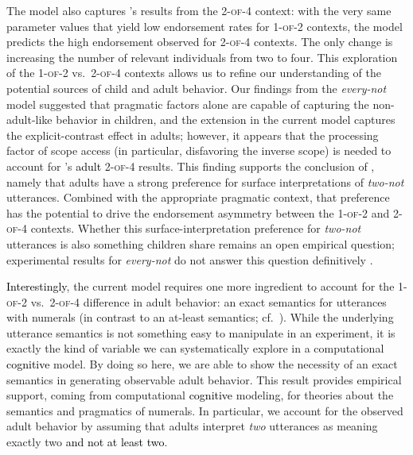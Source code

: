 \documentclass[cm]{glossa}
\newcommand{\lp}[1]{\textcolor{black}{#1}} %
\begin{document}
The model also captures \citeauthor{musolinolidz2003}'s results from the \textsc{2-of-4} context: with the very same parameter values that yield low endorsement rates for \textsc{1-of-2} contexts, the model predicts the high endorsement observed for \textsc{2-of-4} contexts. The only change is increasing the number of relevant individuals from two to four. This exploration of the \textsc{1-of-2} vs.~\textsc{2-of-4} contexts allows us to refine our understanding of the potential sources of child and adult behavior. Our findings from the \emph{every-not} model suggested that pragmatic factors alone are capable of capturing the non-adult-like behavior in children, and the extension in the current model captures the explicit-contrast effect in adults; however, it appears that the processing factor of scope access (in particular, disfavoring the inverse scope) is needed to account for \citeauthor{musolinolidz2003}'s \lp{adult} \textsc{2-of-4} results. This finding supports the conclusion of \citeauthor{musolinolidz2003}, namely that adults have a strong preference for surface interpretations of \emph{two-not} utterances. Combined with the appropriate pragmatic context, that preference has the potential to drive the endorsement asymmetry between the \textsc{1-of-2} and \textsc{2-of-4} contexts. Whether this surface-interpretation preference for  \textit{two-not} utterances is also something children share remains an open empirical question; experimental results for \emph{every-not} do not answer this question definitively \citep{viauetal2010}.

\lp{Interestingly}, the current model requires one more ingredient to account for the \textsc{1-of-2} vs.~\textsc{2-of-4} difference in adult behavior: an {exact} semantics for utterances with numerals (in contrast to an {at-least} semantics; cf.~\citealp{geurts2006,breheny2008,spector2013,kennedy2015}). While the underlying utterance semantics is not something easy to manipulate in an experiment, it is exactly the kind of variable we can systematically explore in a computational \lp{cognitive} model. By doing so here, we are able to show the necessity of an {exact} semantics in generating observable adult behavior. This result provides empirical support, coming from computational \lp{cognitive} modeling, for theories about the semantics and pragmatics of numerals. In particular, we account for the observed adult behavior by assuming that adults interpret \textit{two} utterances as meaning {exactly} two \lp{and not at least two}.
\end{document}
